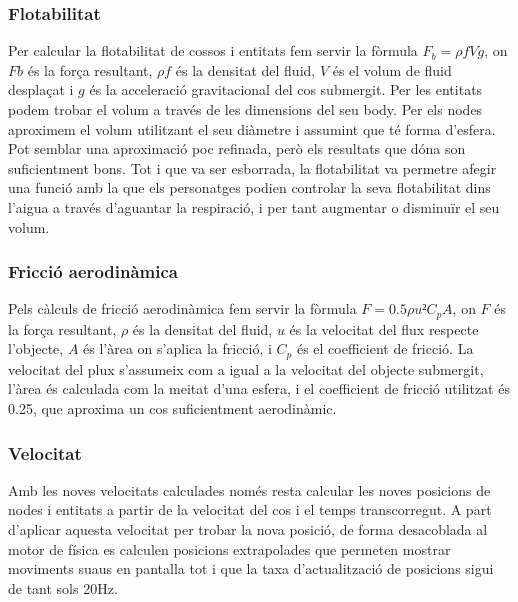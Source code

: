 \subsubsection{Flotabilitat}
Per calcular la flotabilitat de cossos i entitats fem servir la fòrmula $F_{b}=\rho fVg$, on $Fb$ és la força resultant, $\rho f$ és la densitat del fluid, $V$ és el volum de fluid desplaçat i $g$ és la acceleració gravitacional del cos submergit. Per les entitats podem trobar el volum a través de les dimensions del seu body. Per els nodes aproximem el volum utilitzant el seu diàmetre i assumint que té forma d'esfera.  Pot semblar una aproximació poc refinada, però els resultats que dóna son suficientment bons. Tot i que va ser esborrada, la flotabilitat va permetre afegir una funció amb la que els personatges podien controlar la seva flotabilitat dins l'aigua a través d'aguantar la respiració, i per tant augmentar o disminuïr el seu volum. 
\subsubsection{Fricció aerodinàmica}
Pels càlculs de fricció aerodinàmica fem servir la fòrmula $F=0.5\rho u²C_{p}A$, on $F$ és la força resultant, $\rho$ és la densitat del fluid, $u$ és la velocitat del flux respecte l'objecte, $A$ és l'àrea on s'aplica la fricció, i $C_{p}$ és el coefficient de fricció. La velocitat del plux s'assumeix com a igual a la velocitat del objecte submergit, l'àrea és calculada com la meitat d'una esfera, i el coefficient de fricció utilitzat és 0.25, que aproxima un cos suficientment aerodinàmic.
\subsubsection{Velocitat}
Amb les noves velocitats calculades només resta calcular les noves posicions de nodes i entitats a partir de la velocitat del cos i el temps transcorregut. A part d'aplicar aquesta velocitat per trobar la nova posició, de forma desacoblada al motor de física es calculen posicions extrapolades que permeten mostrar moviments suaus en pantalla tot i que la taxa d'actualització de posicions sigui de tant sols 20Hz.
